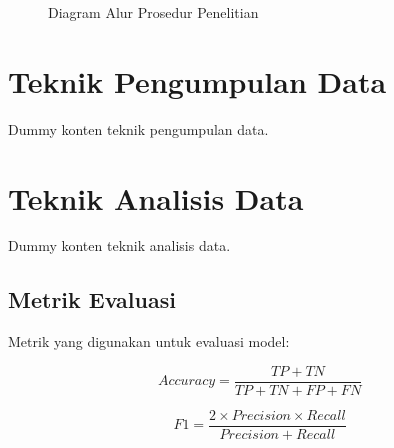 \begin{figure}[h]
    \centering
    \caption{Diagram Alur Prosedur Penelitian}
    \label{fig:prosedur}
\end{figure}

\section{Teknik Pengumpulan Data}
\label{sec:teknik_pengumpulan}

Dummy konten teknik pengumpulan data.

\section{Teknik Analisis Data}
\label{sec:teknik_analisis}

Dummy konten teknik analisis data.

\subsection{Metrik Evaluasi}
\label{subsec:metrik}

Metrik yang digunakan untuk evaluasi model:

\begin{equation}
    Accuracy = \frac{TP + TN}{TP + TN + FP + FN}
    \label{eq:accuracy}
\end{equation}

\begin{equation}
    F1 = \frac{2 \times Precision \times Recall}{Precision + Recall}
    \label{eq:f1}
\end{equation}